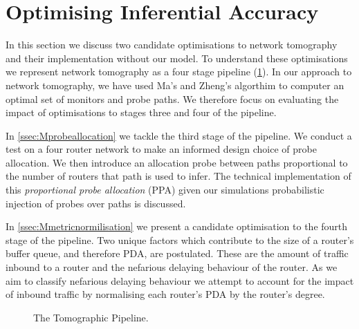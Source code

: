 \section{Optimising Inferential Accuracy}
\label{sec:Moptinferenceaccuracy}
In this section we discuss two candidate optimisations to network tomography and their implementation without our model. To understand these optimisations we represent network tomography as a four stage pipeline (\cref{fig:tomographicpipeline}). In our approach to network tomography, we have used Ma's and Zheng's algorthim to computer an optimal set of monitors and probe paths. We therefore focus on evaluating the impact of optimisations to stages three and four of the pipeline.\par
In \cref{ssec:Mprobeallocation} we tackle the third stage of the pipeline. We conduct a test on a four router network to make an informed design choice of probe allocation. We then introduce an allocation probe between paths proportional to the number of routers that path is used to infer. The technical implementation of this \textit{proportional probe allocation} (PPA) given our simulations probabilistic injection of probes over paths is discussed.\par
In \cref{ssec:Mmetricnormilisation} we present a candidate optimisation to the fourth stage of the pipeline. Two unique factors which contribute to the size of a router's buffer queue, and therefore PDA, are postulated. These are the amount of traffic inbound to a router and the nefarious delaying behaviour of the router. As we aim to classify nefarious delaying behaviour we attempt to account for the impact of inbound traffic by normalising each router's PDA by the router's degree.
\label{sec:Moptprobing}
\begin{figure}[H]
    \centering
    \caption{The Tomographic Pipeline.}
    \label{fig:tomographicpipeline}
\end{figure}

